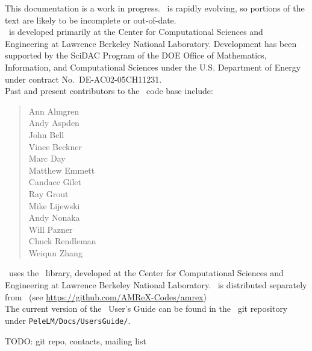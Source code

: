 This documentation is a work in progress.  \pelelm\ is rapidly
evolving, so portions of the text are likely to be incomplete or
out-of-date. \\

\noindent \pelelm\ is developed primarily at the Center for Computational Sciences and
Engineering at Lawrence Berkeley National Laboratory.  Development has been supported
by the SciDAC Program of the DOE Office of Mathematics, Information, and Computational Sciences
under the U.S. Department of Energy under contract No.\ DE-AC02-05CH11231. \\

Past and present contributors to the \pelelm\ code base include: %
\begin{quote}
Ann Almgren\\
Andy Aspden\\
John Bell\\
Vince Beckner\\
Marc Day\\
Matthew Emmett\\
Candace Gilet\\
Ray Grout\\
Mike Lijewski\\
Andy Nonaka\\
Will Pazner\\
Chuck Rendleman\\
Weiqun Zhang\\
\end{quote}

\noindent \pelelm\ uses the \amrex\ library,
developed at the Center for Computational Sciences and Engineering at
Lawrence Berkeley National Laboratory.  \amrex\ is distributed
separately from \pelelm\ (see \url{https://github.com/AMReX-Codes/amrex})
\\

\noindent The current version of the \pelelm\ User's Guide can be found in 
the \pelelm\ git repository under {\tt PeleLM/Docs/UsersGuide/}.

TODO: git repo, contacts, mailing list
